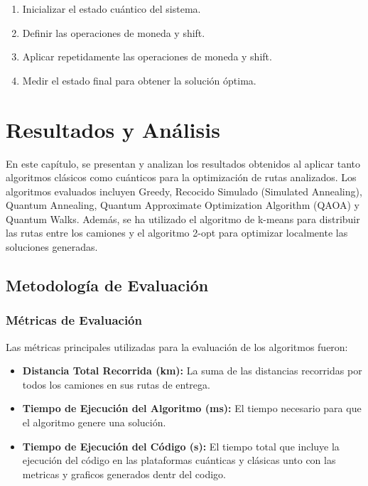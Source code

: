 \documentclass[11pt,a4paper,spanish]{book}
\begin{document}
\begin{tcolorbox}[colback=white!95!blue, colframe=blue!50!black, title=Quantum Walks (QW), fontupper=\ttfamily]
\begin{enumerate}
    \item Inicializar el estado cuántico del sistema.
    \item Definir las operaciones de moneda y shift.
    \item Aplicar repetidamente las operaciones de moneda y shift.
    \item Medir el estado final para obtener la solución óptima.
\end{enumerate}
\end{tcolorbox}


\chapter{Resultados y Análisis}

En este capítulo, se presentan y analizan los resultados obtenidos al aplicar tanto algoritmos clásicos como cuánticos para la optimización de rutas analizados. Los algoritmos evaluados incluyen Greedy, Recocido Simulado (Simulated Annealing), Quantum Annealing, Quantum Approximate Optimization Algorithm (QAOA) y Quantum Walks. Además, se ha utilizado el algoritmo de k-means para distribuir las rutas entre los camiones y el algoritmo 2-opt para optimizar localmente las soluciones generadas.

\section{Metodología de Evaluación}

\subsection{Métricas de Evaluación}

Las métricas principales utilizadas para la evaluación de los algoritmos fueron:

\begin{itemize}
    \item \textbf{Distancia Total Recorrida (km):} La suma de las distancias recorridas por todos los camiones en sus rutas de entrega.
    \item \textbf{Tiempo de Ejecución del Algoritmo (ms):} El tiempo necesario para que el algoritmo genere una solución.
    \item \textbf{Tiempo de Ejecución del Código (s):} El tiempo total que incluye la ejecución del código en las plataformas cuánticas y clásicas unto con las metricas y graficos generados dentr del codigo.
\end{itemize}
\end{document}
